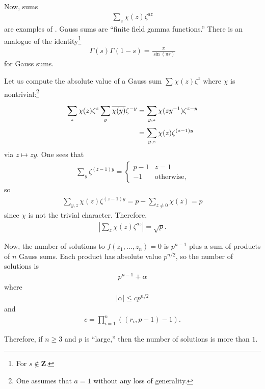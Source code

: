 \documentclass [11 pt, oneside] {article}
\begin{document}
Now, sums
\begin{align*}
	\sum_{z}^{} \chi(z) \zeta^{az}
\end{align*}
are examples of .
Gauss sums are ``finite field gamma functions.'' There is an analogue of the identity\footnote{For $s\notin \mathbf{Z}$.}
\begin{align*}
	\Gamma(s) \Gamma(1-s) = \frac{\pi}{\sin(\pi s)} 
\end{align*}
for Gauss sums.


Let us compute the absolute value of a Gauss sum $\sum_{}^{} \chi(z) \zeta^{z}$ where $\chi$ is nontrivial:\footnote{One assumes that $a = 1$ without any loss of generality.}
\begin{align*}
	\sum_{z}^{} \chi(z) \zeta^{z} \sum_{y}^{} \overline{\chi(y)} \zeta^{-y} &= \sum_{y,z}^{} \chi(zy^{-1}) \zeta^{z-y} \\
									  &= \sum_{y,z}^{} \chi(z) \zeta^{(z-1) y} 
\end{align*}
via $z\longmapsto zy$. One sees that
\begin{align*}
	\sum_{y}^{} \zeta^{(z-1) y}  = 
	\begin{cases}
		p-1&z=1\\
		-1&\textrm{otherwise,}
	\end{cases}
\end{align*}
so
\begin{align*}
	\sum_{y,z}^{} \chi(z) \zeta^{(z-1) y} = p - \sum_{z\ne 0}^{} \chi(z) = p
\end{align*}
since $\chi$ is not the trivial character.
Therefore,
\begin{align*}
	\left\lvert \sum_{z}^{} \chi(z) \zeta^{az} \right\rvert = \sqrt{p}. 
\end{align*}

Now, the number of solutions to $f(z_1,\hdots,z_{n}) =0 $ is $p^{n-1}$ plus a sum of products of $n$ Gauss sums. Each product has absolute value $p^{n/2}$, so the number of solutions is
\begin{align*}
	p^{n-1} + \alpha
\end{align*}
where
\begin{align*}
	\left\lvert \alpha \right\rvert \le c p^{n/2}
\end{align*}
and
\begin{align*}
	c = \prod_{i=1}^{n} ((r_{i}, p-1) - 1).
\end{align*}

Therefore, if $n\ge 3$ and $p$ is ``large,'' then the number of solutions is more than $1$.
\end{document}
